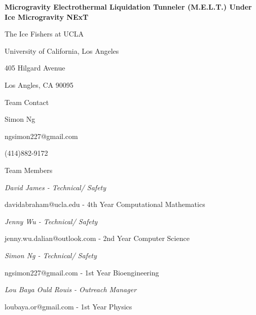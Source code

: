 \documentclass{article}
\begin{document}
\begin{titlepage}
\begin{center}

    \vspace{3cm}
    {\huge\bfseries Microgravity Electrothermal Liquidation Tunneler (M.E.L.T.) 
    Under Ice Microgravity NExT\par}
    
    \vspace{3cm}
    {\huge The Ice Fishers at UCLA\par}
    {\huge University of California, Los Angeles\par} 
    {\huge 405 Hilgard Avenue\par}
    {\huge Los Angles, CA 90095\par}
    
    \vspace{2cm}
    {\Large Team Contact\par}
    \vspace{.5cm}
    {\large Simon Ng\par}
    {\large ngsimon227@gmail.com\par}
    {\large (414)882-9172\par}
    
    
    \vspace{1cm}
    {\Large Team Members\par}
    \vspace{.5cm}
    {\large\itshape David James - Technical/ Safety\par}
    {\large davidabraham@ucla.edu - 4th Year Computational Mathematics\par}
    \vspace{.25cm}
    {\large\itshape Jenny Wu - Technical/ Safety\par}
    {\large jenny.wu.dalian@outlook.com - 2nd Year Computer Science\par}
    \vspace{.25cm}
    {\large\itshape Simon Ng - Technical/ Safety\par}
    {\large ngsimon227@gmail.com - 1st Year Bioengineering\par}
    \vspace{.25cm}
    {\large\itshape Lou Baya Ould Rouis - Outreach Manager\par}
    {\large loubaya.or@gmail.com - 1st Year Physics\par}

\end{center}
\end{titlepage}
\end{document}
